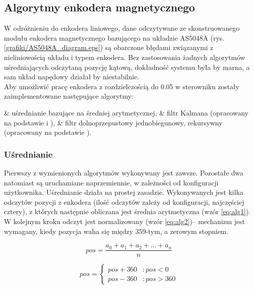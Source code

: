 \subsection{Algorytmy enkodera magnetycznego}
\label{ss:encalg}

W odróżnieniu do enkodera liniowego, dane odczytywane ze skonstruowanego modułu enkodera magnetycznego bazującego na układzie AS5048A (rys. \ref{grafiki/AS5048A_diagram.eps}) są obarczone błędami związanymi z nieliniowością układu i typem enkodera. Bez zastosowania żadnych algorytmów uśredniających odczytaną pozycję kątową, dokładność systemu była by marna, a sam układ napędowy działał by niestabilnie. \\

Aby umożliwić pracę enkodera z rozdzielczością do 0.05\degree{} w sterowniku zostały zaimplementowane następujące algorytmy:

\begin{easylist}
	& uśrednianie bazujące na średniej arytmetycznej,
	& filtr Kalmana (opracowany na podstawie \cite{kalman} i \cite{forbot}),
	& filtr dolnoprzepustowy jednobiegunowy, rekursywny (opracowany na podstawie \cite{smith}).
	\\
\end{easylist} 

\subsubsection{Uśrednianie}

Pierwszy z wymienionych algorytmów wykonywany jest zawsze. Pozostałe dwa natomiast są uruchamiane naprzemiennie, w zależności od konfiguracji użytkownika. Uśrednianie działa na prostej zasadzie. Wykonywanych jest kilka odczytów pozycji z enkodera (ilość odczytów zależy od konfiguracji, najczęściej cztery), z których następnie obliczana jest średnia arytmetyczna (wzór \ref{eq:alg1}). W kolejnym kroku odczyt jest normalizowany (wzór \ref{eq:alg2})-- mechanizm jest wymagany, kiedy pozycja waha się między 359-tym, a zerowym stopniem.

\begin{equation} \label{eq:alg1}
	pos = \frac{a_0 + a_1 + a_2 + ... + a_n}{n} 
\end{equation}

\begin{equation} \label{eq:alg2}
pos = \left\{
  \begin{array}{ll}
    pos + 360 & : pos < 0 \\
    pos - 360 & : pos > 360
  \end{array}
\right.
\end{equation}

